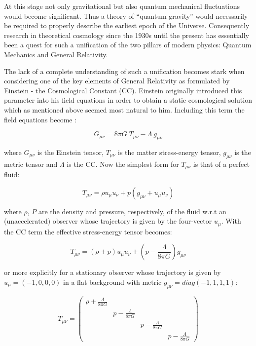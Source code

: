 \documentclass[11pt,english,rmp]{revtex4}
\begin{document}
At this stage not only gravitational but also quantum
mechanical fluctuations would become significant. Thus a theory of
{}``quantum gravity'' would necessarily be required to properly
describe the earliest epoch of the Universe. Consequently research
in theoretical cosmology since the 1930s until the present has essentially
been a quest for such a unification of the two pillars of modern physics:
Quantum Mechanics and General Relativity.

The lack of a complete understanding of such a unification becomes
stark when considering one of the key elements of General Relativity
as formulated by Einstein - the Cosmological Constant (CC). Einstein
originally introduced this parameter into his field equations in order
to obtain a static cosmological solution which as mentioned above
seemed most natural to him. Including this term the field equations
become \cite{Wald1984General}:

\begin{equation}
G_{\mu\nu}=8\pi G\; T_{\mu\nu}-\Lambda\: g_{\mu\nu}\label{eq:GRFieldEqn}\end{equation}


where $G_{\mu\nu}$ is the Einstein tensor, $T_{\mu\nu}$ is the matter
stress-energy tensor, $g_{\mu\nu}$ is the metric tensor and $\Lambda$
is the CC. Now the simplest form for $T_{\mu\nu}$ is that of a perfect
fluid:

\begin{equation}
T_{\mu\nu}=\rho u_{\mu}u_{\nu}+p(g_{\mu\nu}+u_{\mu}u_{\nu})\label{eq:PerfectFluidTensor}\end{equation}


where $\rho$, $P$ are the density and pressure, respectively, of
the fluid w.r.t an (unaccelerated) observer whose trajectory is given
by the four-vector $u_{\mu}$. With the CC term the effective stress-energy
tensor becomes:

\begin{equation}
T_{\mu\nu}=(\rho+p)u_{\mu}u_{\nu}+\left(p-\frac{\Lambda}{8\pi G} \right)g_{\mu\nu}\end{equation}


or more explicitly for a stationary observer whose trajectory is given
by $u_{\mu}=(-1,0,0,0)$ in a flat background with metric $g_{\mu\nu}=diag(-1,1,1,1)$:

\begin{equation}
T_{\mu\nu}=\left(\begin{array}{cccc}
\rho+\frac{\Lambda}{8\pi G}\\
 & p-\frac{\Lambda}{8\pi G}\\
 &  & p-\frac{\Lambda}{8\pi G}\\
 &  &  & p-\frac{\Lambda}{8\pi G}\end{array}\right)\end{equation}
\end{document}
